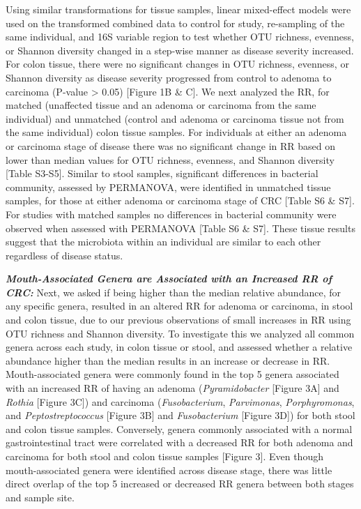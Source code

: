 \documentclass[12pt,]{article}
\begin{document}
Using similar transformations for tissue samples, linear mixed-effect
models were used on the transformed combined data to control for study,
re-sampling of the same individual, and 16S variable region to test
whether OTU richness, evenness, or Shannon diversity changed in a
step-wise manner as disease severity increased. For colon tissue, there
were no significant changes in OTU richness, evenness, or Shannon
diversity as disease severity progressed from control to adenoma to
carcinoma (P-value \textgreater{} 0.05) {[}Figure 1B \& C{]}. We next
analyzed the RR, for matched (unaffected tissue and an adenoma or
carcinoma from the same individual) and unmatched (control and adenoma
or carcinoma tissue not from the same individual) colon tissue samples.
For individuals at either an adenoma or carcinoma stage of disease there
was no significant change in RR based on lower than median values for
OTU richness, evenness, and Shannon diversity {[}Table S3-S5{]}. Similar
to stool samples, significant differences in bacterial community,
assessed by PERMANOVA, were identified in unmatched tissue samples, for
those at either adenoma or carcinoma stage of CRC {[}Table S6 \& S7{]}.
For studies with matched samples no differences in bacterial community
were observed when assessed with PERMANOVA {[}Table S6 \& S7{]}. These
tissue results suggest that the microbiota within an individual are
similar to each other regardless of disease status.

\textbf{\emph{Mouth-Associated Genera are Associated with an Increased
RR of CRC:}} Next, we asked if being higher than the median relative
abundance, for any specific genera, resulted in an altered RR for
adenoma or carcinoma, in stool and colon tissue, due to our previous
observations of small increases in RR using OTU richness and Shannon
diversity. To investigate this we analyzed all common genera across each
study, in colon tissue or stool, and assessed whether a relative
abundance higher than the median results in an increase or decrease in
RR. Mouth-associated genera were commonly found in the top 5 genera
associated with an increased RR of having an adenoma
(\emph{Pyramidobacter} {[}Figure 3A{]} and \emph{Rothia} {[}Figure
3C{]}) and carcinoma (\emph{Fusobacterium}, \emph{Parvimonas},
\emph{Porphyromonas}, and \emph{Peptostreptococcus} {[}Figure 3B{]} and
\emph{Fusobacterium} {[}Figure 3D{]}) for both stool and colon tissue
samples. Conversely, genera commonly associated with a normal
gastrointestinal tract were correlated with a decreased RR for both
adenoma and carcinoma for both stool and colon tissue samples {[}Figure
3{]}. Even though mouth-associated genera were identified across disease
stage, there was little direct overlap of the top 5 increased or
decreased RR genera between both stages and sample site.
\end{document}
